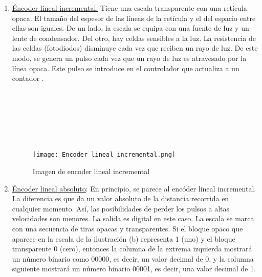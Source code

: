 \begin{enumerate}
\begin{enumerate}
\begin{enumerate}
			\begin{enumerate}
				\item \underline{Éncoder lineal incremental:} Tiene una
				escala transparente con una retícula opaca. El tamaño del espesor de las líneas de la retícula y el del espacio entre ellas son iguales. De un lado, la escala se equipa con una fuente de luz y un lente de condensador. Del otro, hay celdas sensibles a la luz. La resistencia de las celdas (fotodiodos) disminuye cada vez que reciben un rayo de luz. De este modo, se genera un pulso cada vez que un rayo de luz es atravesado por la línea opaca. Este pulso se introduce en el controlador que actualiza a un contador \cite{saha2010robotics}.
				\\
				\\
				\\
				\\
				\\
				\\
				\\
		\begin{figure}[h]
	\centering
		\texttt{[image: Encoder\_lineal\_incremental.png]}%
		\label{fig:Encoder_lineal_incremental}
		\cite{saha2010robotics}
	\caption{Imagen de encoder lineal incremental}
	\hfill
\end{figure}				

				\item \underline{Éncoder lineal absoluto}: En principio, se parece al encóder lineal incremental.  La diferencia es que da un valor absoluto de la distancia recorrida en cualquier momento. Así,
				las posibilidades de perder los pulsos a altas velocidades son menores. La salida es digital
				en este caso. La escala se marca con una secuencia de tiras opacas y transparentes. Si el bloque opaco que aparece en la escala de la ilustración (b)  representa 1 (uno) y el bloque transparente 0 (cero), entonces la columna de la extrema izquierda mostrará un número binario como 00000, es decir, un valor decimal de 0, y la columna siguiente mostrará un número binario 00001, es decir, una valor decimal de 1.\cite{saha2010robotics}
				
				\begin{figure}[h]
					\centering
					\hfill
\end{figure}
\end{enumerate}
\end{enumerate}
\end{enumerate}
\end{enumerate}

